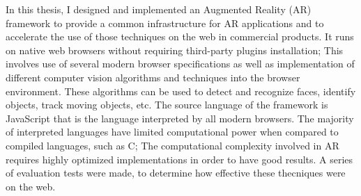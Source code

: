 In this thesis, I designed and implemented an Augmented Reality (AR) framework
to provide a common infrastructure for AR applications and to accelerate the use
of those techniques on the web in commercial products. It runs on native web
browsers without requiring third-party plugins installation; This involves use
of several modern browser specifications as well as implementation
of different computer vision algorithms and techniques into the browser environment.
These algorithms can be used to detect and recognize faces, identify objects,
track moving objects, etc.  The source language of the framework is JavaScript
that is the language interpreted by all modern browsers.   The majority of
interpreted languages have limited computational power when compared to compiled
languages, such as C; The computational complexity involved in AR requires highly
optimized implementations in order to have good results.  A series of evaluation
tests were made, to determine how effective these thecniques were on the web.


